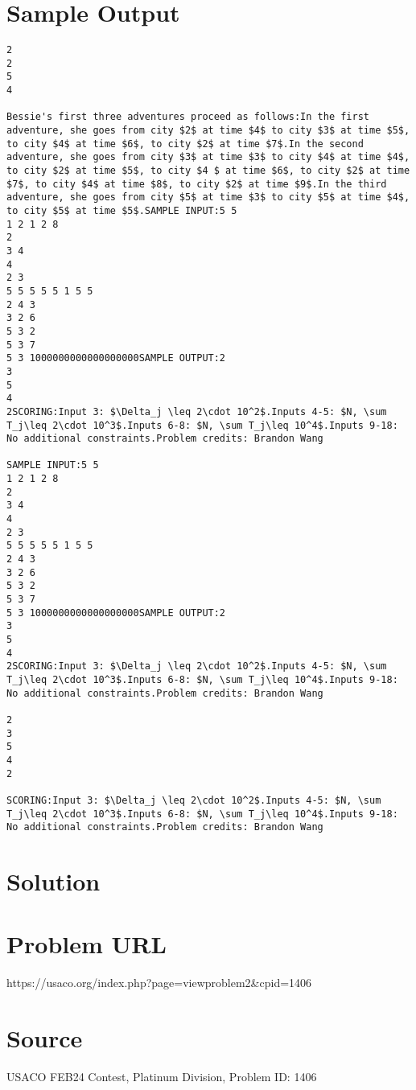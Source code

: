 \documentclass[12pt]{article}
\begin{document}
\section*{Sample Output}
\begin{verbatim}
2
2
5
4

Bessie's first three adventures proceed as follows:In the first adventure, she goes from city $2$ at time $4$ to city $3$ at time $5$, to city $4$ at time $6$, to city $2$ at time $7$.In the second adventure, she goes from city $3$ at time $3$ to city $4$ at time $4$, to city $2$ at time $5$, to city $4 $ at time $6$, to city $2$ at time $7$, to city $4$ at time $8$, to city $2$ at time $9$.In the third adventure, she goes from city $5$ at time $3$ to city $5$ at time $4$, to city $5$ at time $5$.SAMPLE INPUT:5 5
1 2 1 2 8
2
3 4
4
2 3
5 5 5 5 5 1 5 5
2 4 3
3 2 6
5 3 2
5 3 7
5 3 1000000000000000000SAMPLE OUTPUT:2
3
5
4
2SCORING:Input 3: $\Delta_j \leq 2\cdot 10^2$.Inputs 4-5: $N, \sum T_j\leq 2\cdot 10^3$.Inputs 6-8: $N, \sum T_j\leq 10^4$.Inputs 9-18: No additional constraints.Problem credits: Brandon Wang

SAMPLE INPUT:5 5
1 2 1 2 8
2
3 4
4
2 3
5 5 5 5 5 1 5 5
2 4 3
3 2 6
5 3 2
5 3 7
5 3 1000000000000000000SAMPLE OUTPUT:2
3
5
4
2SCORING:Input 3: $\Delta_j \leq 2\cdot 10^2$.Inputs 4-5: $N, \sum T_j\leq 2\cdot 10^3$.Inputs 6-8: $N, \sum T_j\leq 10^4$.Inputs 9-18: No additional constraints.Problem credits: Brandon Wang

2
3
5
4
2

SCORING:Input 3: $\Delta_j \leq 2\cdot 10^2$.Inputs 4-5: $N, \sum T_j\leq 2\cdot 10^3$.Inputs 6-8: $N, \sum T_j\leq 10^4$.Inputs 9-18: No additional constraints.Problem credits: Brandon Wang
\end{verbatim}

\section*{Solution}


\section*{Problem URL}
https://usaco.org/index.php?page=viewproblem2&cpid=1406

\section*{Source}
USACO FEB24 Contest, Platinum Division, Problem ID: 1406
\end{document}
